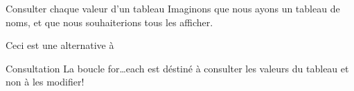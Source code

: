 \begin{frame}{Consulter chaque valeur d'un tableau}
    \pause
    Imaginons que nous ayons un tableau de noms, et que nous souhaiterions tous les afficher.
    

    \pause
    Ceci est une alternative à
    

    \pause
    \begin{alertblock}{Consultation}
        La boucle for\ldots each est déstiné à consulter les valeurs du tableau et non à les modifier!
    \end{alertblock}
\end{frame}